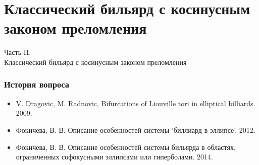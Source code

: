 \section{Классический бильярд с косинусным законом преломления}
\begin{frame}
    \begin{center}
        \Huge
	Часть II. \\ Классический бильярд с косинусным законом преломления
    \end{center}
\end{frame}

\begin{frame}
\frametitle{История вопроса}
\begin{itemize}
\item[1.] V. Dragovic, M. Radnovic, Bifurcations of Liouville tori in elliptical billiards. 2009.
\item[2.] Фокичева, В. В. Описание особенностей системы ’биллиард в эллипсе’. 2012.
\item[3.] Фокичева, В. В. Описание особенностей системы бильярда в областях, ограниченных
софокусными эллипсами или гиперболами. 2014.
\end{itemize}
\end{frame}

